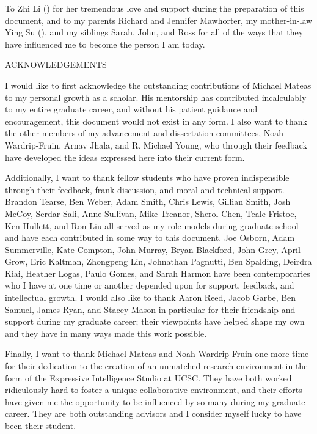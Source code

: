 \clearpage
{}
\addtolength{\baselineskip}{0pt plus 1pt minus 1pt}
\vspace*{\fill}
{
\centering
To Zhi Li () for her tremendous love and support during the preparation of this document, and to my parents Richard and Jennifer Mawhorter, my mother-in-law Ying Su (), and my siblings Sarah, John, and Ross for all of the ways that they have influenced me to become the person I am today. \\
}
\vspace*{\fill}
\clearpage
{}
{
\centering
ACKNOWLEDGEMENTS \vspace{0.5em} \\
}
{
\justifying
I would like to first acknowledge the outstanding contributions of Michael Mateas to my personal growth as a scholar.
%
His mentorship has contributed incalculably to my entire graduate career, and without his patient guidance and encouragement, this document would not exist in any form.
%
I also want to thank the other members of my advancement and dissertation committees, Noah Wardrip-Fruin, Arnav Jhala, and R\@. Michael Young, who through their feedback have developed the ideas expressed here into their current form.


Additionally, I want to thank fellow students who have proven indispensible through their feedback, frank discussion, and moral and technical support.
%
Brandon Tearse, Ben Weber, Adam Smith, Chris Lewis, Gillian Smith, Josh McCoy, Serdar Sali, Anne Sullivan, Mike Treanor, Sherol Chen, Teale Fristoe, Ken Hullett, and Ron Liu all served as my role models during graduate school and have each contributed in some way to this document.
%
Joe Osborn, Adam Summerville, Kate Compton, John Murray, Bryan Blackford, John Grey, April Grow, Eric Kaltman, Zhongpeng Lin, Johnathan Pagnutti, Ben Spalding, Deirdra Kiai, Heather Logas, Paulo Gomes, and Sarah Harmon have been contemporaries who I have at one time or another depended upon for support, feedback, and intellectual growth.
%
I would also like to thank Aaron Reed, Jacob Garbe, Ben Samuel, James Ryan, and Stacey Mason in particular for their friendship and support during my graduate career; their viewpoints have helped shape my own and they have in many ways made this work possible.


Finally, I want to thank Michael Mateas and Noah Wardrip-Fruin one more time for their dedication to the creation of an unmatched research environment in the form of the Expressive Intelligence Studio at UCSC.
%
They have both worked ridiculously hard to foster a unique collaborative environment, and their efforts have given me the opportunity to be influenced by so many during my graduate career.
%
They are both outstanding advisors and I consider myself lucky to have been their student.
}
\clearpage
\markboth{}{}
\thispagestyle{empty}

\cleardoublepage
